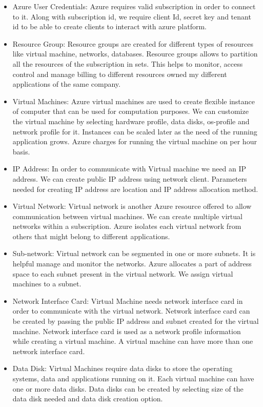 \begin{itemize}

\item Azure User Credentials: Azure requires valid subscription in order to
connect to it. Along with subscription id, we require client Id, secret key and
tenant id to be able to create clients to interact with azure platform.

\item Resource Group: Resource groups are created for different types of
resources like virtual machine, networks, databases. Resource groups allows to
partition all the resources of the subscription in sets. This helps to monitor,
access control and manage billing to different resources owned my different
applications of the same company.

\item Virtual Machines: Azure virtual machines are used to create flexible
instance of computer that can be used for computation purposes. We can
customize the virtual machine by selecting hardware profile, data disks,
os-profile and network profile for it. Instances can be scaled later as the
need of the running application grows. Azure charges for running the virtual
machine on per hour basis.

\item IP Address: In order to communicate with Virtual machine we need an IP
address. We can create public IP address using network client. Parameters
needed for creating IP address are location and IP address allocation method.

\item Virtual Network: Virtual network is another Azure resource offered to
allow communication between virtual machines. We can create multiple virtual
networks within a subscription. Azure isolates each virtual network from others
that might belong to different applications.

\item Sub-network: Virtual network can be segmented in one or more subnets. It
is helpful manage and monitor the networks. Azure allocates a part of address
space to each subnet present in the virtual network. We assign virtual machines
to a subnet.

\item Network Interface Card: Virtual Machine needs network interface card in
order to communicate with the virtual network. Network interface card can be
created by passing the public IP address and subnet created for the virtual
machine. Network interface card is used as a network profile information while
creating a virtual machine. A virtual machine can have more than one network
interface card.

\item Data Disk: Virtual Machines require data disks to store the operating
systems, data and applications running on it. Each virtual machine can have one
or more data disks. Data disks can be created by selecting size of the data
disk needed and data disk creation option.

\end{itemize}

